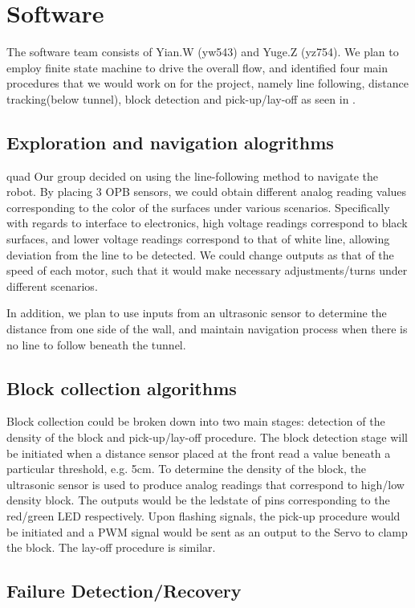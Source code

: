 \documentclass{article}
\begin{document}
\section{Software}
\quad The software team consists of Yian.W (yw543) and Yuge.Z (yz754). We plan to employ finite state machine to drive the overall flow, and identified four main procedures that we would work on for the project, namely line following, distance tracking(below tunnel), block detection and pick-up/lay-off as seen in .  

\subsection{Exploration and navigation alogrithms}
\quad quad Our group decided on using the line-following method to navigate the robot. By placing 3 OPB sensors, we could obtain different analog reading values corresponding to the color of the surfaces under various scenarios. Specifically with regards to interface to electronics, high voltage readings correspond to black surfaces, and lower voltage readings correspond to that of white line, allowing deviation from the line to be detected. We could change outputs as that of the speed of each motor, such that it would make necessary adjustments/turns under different scenarios. 

\quad In addition, we plan to use inputs from an ultrasonic sensor to determine the distance from one side of the wall, and maintain navigation process when there is no line to follow beneath the tunnel. 

\subsection{Block collection algorithms}
\quad Block collection could be broken down into two main stages: detection of the density of the block and pick-up/lay-off procedure. The block detection stage will be initiated when a distance sensor placed at the front read a value beneath a particular threshold, e.g. 5cm. To determine the density of the block, the ultrasonic sensor is used to produce analog readings that correspond to high/low density block. The outputs would be the ledstate of pins corresponding to the red/green LED respectively. Upon flashing signals, the pick-up procedure would be initiated and a PWM signal would be sent as an output to the Servo to clamp the block. The lay-off procedure is similar. 

\subsection{Failure Detection/Recovery}
\quad %
\end{document}
